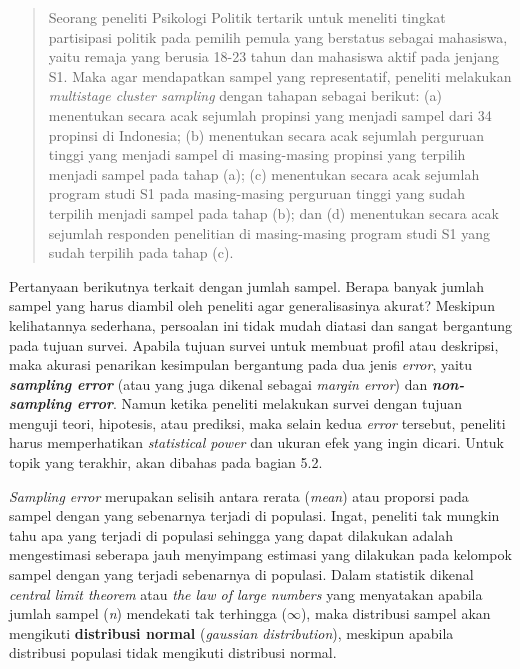 \documentclass[
  english,
  man]{apa6}
\begin{document}
\begin{quote}
Seorang peneliti Psikologi Politik tertarik untuk meneliti tingkat partisipasi politik pada pemilih pemula yang berstatus sebagai mahasiswa, yaitu remaja yang berusia 18-23 tahun dan mahasiswa aktif pada jenjang S1. Maka agar mendapatkan sampel yang representatif, peneliti melakukan \emph{multistage cluster sampling} dengan tahapan sebagai berikut: (a) menentukan secara acak sejumlah propinsi yang menjadi sampel dari 34 propinsi di Indonesia; (b) menentukan secara acak sejumlah perguruan tinggi yang menjadi sampel di masing-masing propinsi yang terpilih menjadi sampel pada tahap (a); (c) menentukan secara acak sejumlah program studi S1 pada masing-masing perguruan tinggi yang sudah terpilih menjadi sampel pada tahap (b); dan (d) menentukan secara acak sejumlah responden penelitian di masing-masing program studi S1 yang sudah terpilih pada tahap (c).
\end{quote}

Pertanyaan berikutnya terkait dengan jumlah sampel. Berapa banyak jumlah sampel yang harus diambil oleh peneliti agar generalisasinya akurat? Meskipun kelihatannya sederhana, persoalan ini tidak mudah diatasi dan sangat bergantung pada tujuan survei. Apabila tujuan survei untuk membuat profil atau deskripsi, maka akurasi penarikan kesimpulan bergantung pada dua jenis \emph{error}, yaitu \textbf{\emph{sampling error}} (atau yang juga dikenal sebagai \emph{margin error}) dan \textbf{\emph{non-sampling error}}. Namun ketika peneliti melakukan survei dengan tujuan menguji teori, hipotesis, atau prediksi, maka selain kedua \emph{error} tersebut, peneliti harus memperhatikan \emph{statistical power} dan ukuran efek yang ingin dicari. Untuk topik yang terakhir, akan dibahas pada bagian 5.2.

\emph{Sampling error} merupakan selisih antara rerata (\emph{mean}) atau proporsi pada sampel dengan yang sebenarnya terjadi di populasi. Ingat, peneliti tak mungkin tahu apa yang terjadi di populasi sehingga yang dapat dilakukan adalah mengestimasi seberapa jauh menyimpang estimasi yang dilakukan pada kelompok sampel dengan yang terjadi sebenarnya di populasi. Dalam statistik dikenal \emph{central limit theorem} atau \emph{the law of large numbers} yang menyatakan apabila jumlah sampel (\emph{n}) mendekati tak terhingga (\(\infty\)), maka distribusi sampel akan mengikuti \textbf{distribusi normal} (\emph{gaussian distribution}), meskipun apabila distribusi populasi tidak mengikuti distribusi normal.
\end{document}
